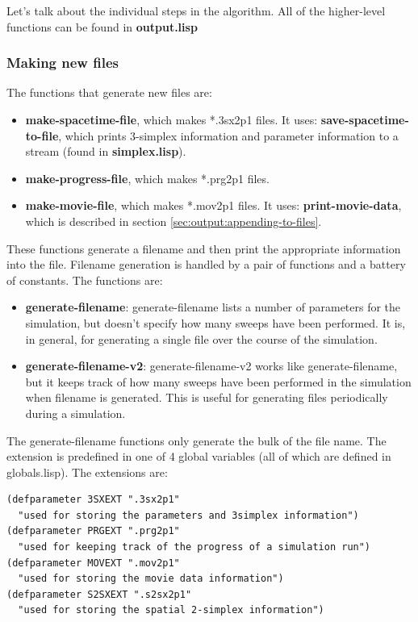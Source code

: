\message{ !name(programmers_guide.tex)}\documentclass[12pt]{article}
\begin{document}
Let's talk about the individual steps in the algorithm. All of the
higher-level functions can be found in \textbf{output.lisp}

\subsubsection{Making new files}
\label{sec:output-new-files}

The functions that generate new files are:

\begin{itemize}
\item \textbf{make-spacetime-file}, which makes *.3sx2p1 files. It
  uses: 
  \subitem \textbf{save-spacetime-to-file}, which prints
  3-simplex information and parameter information to a stream (found
  in \textbf{simplex.lisp}).
\item \textbf{make-progress-file}, which makes *.prg2p1 files.
\item \textbf{make-movie-file}, which makes *.mov2p1 files. It uses:
  \subitem \textbf{print-movie-data}, which is described in section
  \ref{sec:output:appending-to-files}.
\end{itemize}

These functions generate a filename and then print the appropriate
information into the file. Filename generation is handled by a pair of
functions and a battery of constants. The functions are:
\begin{itemize}
\item \textbf{generate-filename}: generate-filename lists a number of
parameters for the simulation, but doesn't specify how many sweeps
have been performed. It is, in general, for generating a single file
over the course of the simulation.
\item \textbf{generate-filename-v2}: generate-filename-v2 works like
  generate-filename, but it keeps track of how many sweeps have been
  performed in the simulation when filename is generated. This is
  useful for generating files periodically during a simulation.
\end{itemize}
The generate-filename functions only generate the bulk of the file
name. The extension is predefined in one of 4 global variables (all of
which are defined in globals.lisp). The extensions are:
\begin{lstlisting}
(defparameter 3SXEXT ".3sx2p1" 
  "used for storing the parameters and 3simplex information")
(defparameter PRGEXT ".prg2p1" 
  "used for keeping track of the progress of a simulation run")
(defparameter MOVEXT ".mov2p1" 
  "used for storing the movie data information")
(defparameter S2SXEXT ".s2sx2p1" 
  "used for storing the spatial 2-simplex information")
\end{lstlisting}
\end{document}
